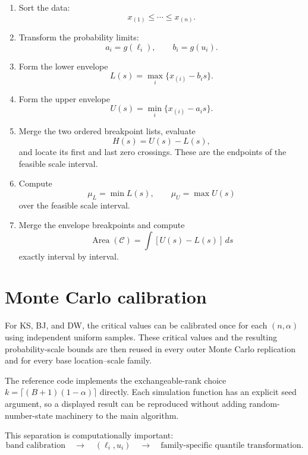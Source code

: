 \documentclass[11pt]{article}
\newcommand{\cC}{\mathcal{C}}
\begin{document}
\begin{enumerate}
    \item
    Sort the data:
    \[
        x_{(1)}\leq\cdots\leq x_{(n)}.
    \]

    \item
    Transform the probability limits:
    \[
        a_i=g(\ell_i),
        \qquad
        b_i=g(u_i).
    \]

    \item
    Form the lower envelope
    \[
        L(s)
        =
        \max_i
        \{x_{(i)}-b_i s\}.
    \]

    \item
    Form the upper envelope
    \[
        U(s)
        =
        \min_i
        \{x_{(i)}-a_i s\}.
    \]

    \item
    Merge the two ordered breakpoint lists, evaluate
    \[
        H(s)=U(s)-L(s),
    \]
    and locate its first and last zero crossings.  These are the
    endpoints of the feasible scale interval.

    \item
    Compute
    \[
        \mu_L=\min L(s),
        \qquad
        \mu_U=\max U(s)
    \]
    over the feasible scale interval.

    \item
    Merge the envelope breakpoints and compute
    \[
        \operatorname{Area}(\cC)
        =
        \int
        [U(s)-L(s)]\,ds
    \]
    exactly interval by interval.
\end{enumerate}


\section{Monte Carlo calibration}

For KS, BJ, and DW, the critical values can be calibrated once for each
$(n,\alpha)$ using independent uniform samples.  These critical values
and the resulting probability-scale bounds are then reused in every
outer Monte Carlo replication and for every base location--scale
family.

The reference code implements the exchangeable-rank choice
$k=\lceil(B+1)(1-\alpha)\rceil$ directly.  Each simulation function has
an explicit seed argument, so a displayed result can be reproduced
without adding random-number-state machinery to the main algorithm.

This separation is computationally important:
\[
    \text{band calibration}
    \quad\longrightarrow\quad
    (\ell_i,u_i)
    \quad\longrightarrow\quad
    \text{family-specific quantile transformation}.
\]
\end{document}
